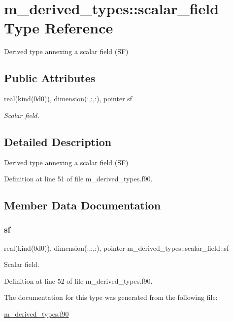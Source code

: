 \hypertarget{structm__derived__types_1_1scalar__field}{}\section{m\+\_\+derived\+\_\+types\+:\+:scalar\+\_\+field Type Reference}
\label{structm__derived__types_1_1scalar__field}


Derived type annexing a scalar field (SF)  


\subsection*{Public Attributes}
\begin{DoxyCompactItemize}
\item 
real(kind(0d0)), dimension(\+:,\+:,\+:), pointer \hyperlink{structm__derived__types_1_1scalar__field_a81eef148a1645bae2476fffacb82d735}{sf}
\begin{DoxyCompactList}\small\item\em Scalar field. \end{DoxyCompactList}\end{DoxyCompactItemize}


\subsection{Detailed Description}
Derived type annexing a scalar field (SF) 

Definition at line 51 of file m\+\_\+derived\+\_\+types.\+f90.



\subsection{Member Data Documentation}
\mbox{\label{structm__derived__types_1_1scalar__field_a81eef148a1645bae2476fffacb82d735}} 
\subsubsection{\texorpdfstring{sf}{sf}}
{\footnotesize\ttfamily real(kind(0d0)), dimension(\+:,\+:,\+:), pointer m\+\_\+derived\+\_\+types\+::scalar\+\_\+field\+::sf}



Scalar field. 



Definition at line 52 of file m\+\_\+derived\+\_\+types.\+f90.



The documentation for this type was generated from the following file\+:\begin{DoxyCompactItemize}
\item 
\hyperlink{m__derived__types_8f90}{m\+\_\+derived\+\_\+types.\+f90}\end{DoxyCompactItemize}
